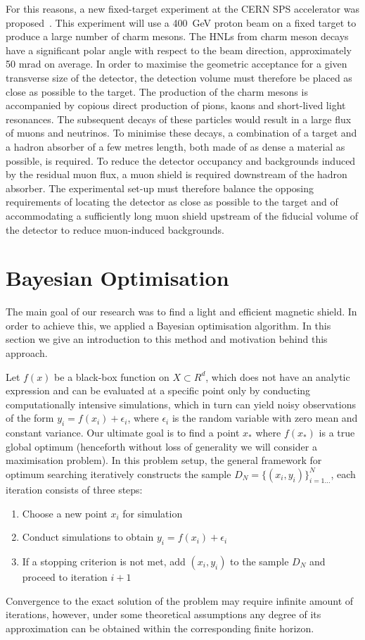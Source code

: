 \documentclass[a4paper]{jpconf}
\theoremstyle{my_theorem_style}
\numberwithin{equation}{section}
\begin{document}
For this reasons, a new fixed-target experiment at the CERN SPS accelerator was proposed~\cite{Bonivento:2013jag}. This experiment will use a 400~GeV proton beam on a fixed target to produce a large number of charm mesons. The HNLs from charm meson decays have a significant polar angle with respect to the beam direction, approximately 50 mrad on average. In order to maximise the geometric
acceptance for a given transverse size of the detector, the detection volume must therefore be placed
as close as possible to the target. The production of the charm mesons is accompanied by copious direct production of pions, kaons and short-lived light resonances. The subsequent decays of these particles would result in a large flux of muons and neutrinos. To minimise these decays, a combination of a target and a hadron absorber of a few metres length, both made of as dense a material as possible, is required. To reduce the detector occupancy and backgrounds induced by the residual muon flux, a muon shield is required downstream of the hadron absorber. The experimental set-up must therefore balance the opposing requirements of locating the detector as close as possible to the target and of accommodating a sufficiently long muon shield upstream of the fiducial volume of the detector to reduce muon-induced backgrounds.

\section{Bayesian Optimisation}
The main goal of our research was to find a light and efficient
magnetic shield. In order to achieve this, we applied a Bayesian optimisation algorithm. In this section we give an introduction to this method and motivation behind this approach.

Let $f(x)$ be a black-box function on $X \subset R^d$, which does not have an analytic expression and can be evaluated at a specific point only by conducting computationally intensive simulations, which in turn can yield noisy observations of the form $y_i = f(x_i) + \epsilon_i$, where $\epsilon_i$ is the random variable with zero mean and constant variance. Our ultimate goal is to find a point $x_*$ where $f(x_*)$ is a true global optimum (henceforth without loss of generality we will consider a maximisation problem). In this problem setup, the general framework for optimum searching iteratively constructs the sample $D_N = \{(x_i, y_i)\}_{i=1…}^N$, each iteration consists of three steps:
\begin{enumerate}
\item \label{point_choosing} Choose a new point $x_{i}$ for simulation 
\item Conduct simulations to obtain $y_{i} = f(x_{i}) + \epsilon_i$
\item If a stopping criterion is not met, add $(x_{i}, y_{i})$ to the sample $D_N$ and proceed to iteration $i+1$
\end{enumerate}
Convergence to the exact solution of the problem may require infinite amount of iterations, however, under some theoretical assumptions any degree of its approximation can be obtained within the corresponding finite horizon.
\end{document}
